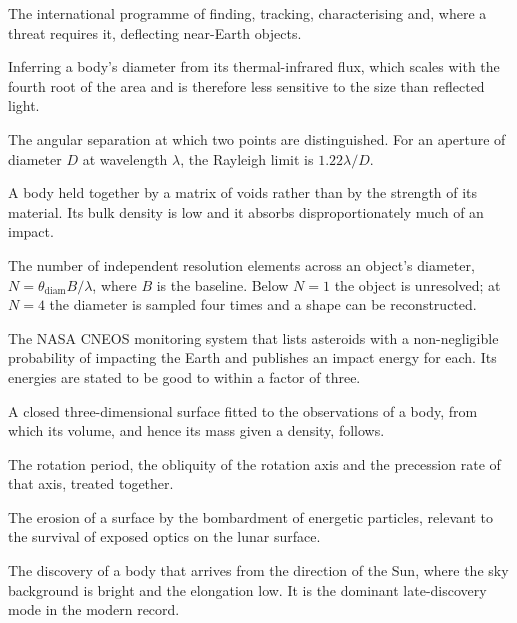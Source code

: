 \begin{description}[style=nextline,leftmargin=1.1em,labelindent=0pt,
  font=\normalfont\ttfamily\color{accent},itemsep=3pt,parsep=0pt]
\item[Planetary defence] The international programme of finding, tracking,
characterising and, where a threat requires it, deflecting near-Earth
objects.

\item[Radiometry] Inferring a body's diameter from its thermal-infrared
flux, which scales with the fourth root of the area and is therefore less
sensitive to the size than reflected light.

\item[Resolution] The angular separation at which two points are
distinguished. For an aperture of diameter \(D\) at wavelength \(\lambda\),
the Rayleigh limit is \(1.22\lambda/D\).

\item[Rubble pile] A body held together by a matrix of voids rather than by
the strength of its material. Its bulk density is low and it absorbs
disproportionately much of an impact.

\item[Sampling] The number of independent resolution elements across an
object's diameter, \(N = \theta_{\mathrm{diam}} B / \lambda\), where \(B\) is
the baseline. Below \(N = 1\) the object is unresolved; at \(N = 4\) the
diameter is sampled four times and a shape can be reconstructed.

\item[Sentry] The NASA CNEOS monitoring system that lists asteroids with a
non-negligible probability of impacting the Earth and publishes an impact
energy for each. Its energies are stated to be good to within a factor of
three.

\item[Shape model] A closed three-dimensional surface fitted to the
observations of a body, from which its volume, and hence its mass given a
density, follows.

\item[Spin state] The rotation period, the obliquity of the rotation axis and
the precession rate of that axis, treated together.

\item[Sputtering] The erosion of a surface by the bombardment of energetic
particles, relevant to the survival of exposed optics on the lunar surface.

\item[Sun-ward discovery] The discovery of a body that arrives from the
direction of the Sun, where the sky background is bright and the elongation
low. It is the dominant late-discovery mode in the modern record.


\end{description}
